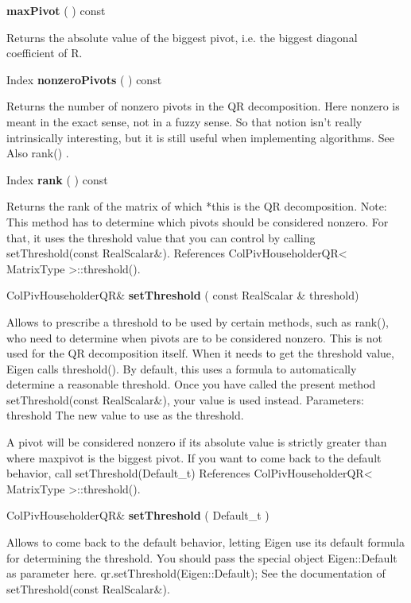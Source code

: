 \vspace{0.3cm}
\textbf{maxPivot}  ( )  const 

Returns the absolute value of the biggest pivot, i.e. the biggest diagonal coefficient of R. 

\vspace{0.3cm}
Index \textbf{nonzeroPivots}  ( )  const 

Returns the number of nonzero pivots in the QR decomposition. Here nonzero is meant in the exact sense, not in a fuzzy sense. So that notion isn't really intrinsically interesting, but it is still useful when implementing algorithms.
See Also rank() .


\vspace{0.3cm}
Index \textbf{rank}  ( )  const 

Returns the rank of the matrix of which *this is the QR decomposition.
Note: This method has to determine which pivots should be considered nonzero. For that, it uses the threshold value that you can control by calling setThreshold(const RealScalar\&). References ColPivHouseholderQR< MatrixType >::threshold().


\vspace{0.3cm}
ColPivHouseholderQR\& \textbf{setThreshold}  ( const RealScalar \&  threshold)   

Allows to prescribe a threshold to be used by certain methods, such as rank(), who need to determine when pivots are to be considered nonzero. This is not used for the QR decomposition itself.
When it needs to get the threshold value, Eigen calls threshold(). By default, this uses a formula to automatically determine a reasonable threshold. Once you have called the present method setThreshold(const RealScalar\&), your value is used instead.
Parameters: threshold The new value to use as the threshold. 

A pivot will be considered nonzero if its absolute value is strictly greater than  where maxpivot is the biggest pivot.
If you want to come back to the default behavior, call setThreshold(Default\_t) 
References ColPivHouseholderQR< MatrixType >::threshold().

\vspace{0.3cm}
ColPivHouseholderQR\& \textbf{setThreshold}  ( Default\_t  )   

Allows to come back to the default behavior, letting Eigen use its default formula for determining the threshold.
You should pass the special object Eigen::Default as parameter here. 
qr.setThreshold(Eigen::Default); See the documentation of setThreshold(const RealScalar\&). 


